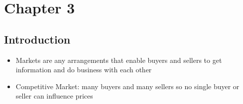 \documentclass[11pt]{article}
\author{Sudhan Chitgopkar}
\date{\today}
\title{}
\begin{document}
\tableofcontents

\section{Chapter 3}
\label{sec:org3bcfca5}
\subsection{Introduction}
\label{sec:orgb8a3986}
\begin{itemize}
\item Markets are any arrangements that enable buyers and sellers to get information
and do business with each other
\item Competitive Market: many buyers and many sellers so no single buyer or seller can
influence prices
\end{itemize}
\end{document}
